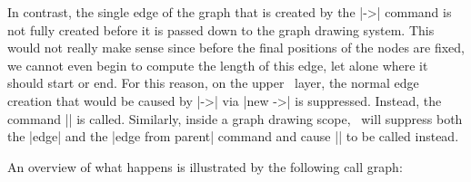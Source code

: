 In contrast, the single edge of the graph that is created by the |->| command
is not fully created before it is passed down to the graph drawing system. This
would not really make sense since before the final positions of the nodes are
fixed, we cannot even begin to compute the length of this edge, let alone where
it should start or end. For this reason, on the upper \tikzname\ layer, the
normal edge creation that would be caused by |->| via |new ->| is suppressed.
Instead, the command |\pgfgdedge| is called. Similarly, inside a graph drawing
scope, \tikzname\ will suppress both the |edge| and the |edge from parent|
command and cause |\pgfgdedge| to be called instead.

An overview of what happens is illustrated by the following call graph:

\bigskip

